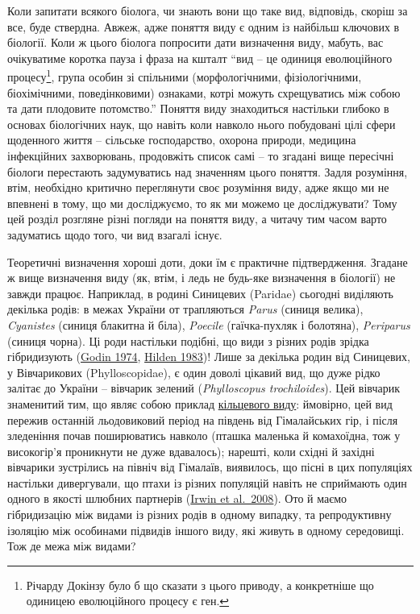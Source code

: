 \documentclass[
  11pt,
]{book}
\begin{document}
Коли запитати всякого біолога, чи знають вони що таке вид, відповідь, скоріш за все, буде ствердна. Авжеж, адже поняття виду є одним із найбільш ключових в біології. Коли ж цього біолога попросити дати визначення виду, мабуть, вас очікуватиме коротка пауза і фраза на кшталт ``вид -- це одиниця еволюційного процесу\footnote{Річарду Докінзу було б що сказати з цього приводу, а конкретніше що одиницею еволюційного процесу є ген.}, група особин зі спільними (морфологічними, фізіологічними, біохімічними, поведінковими) ознаками, котрі можуть схрещуватись між собою та дати плодовите потомство.'' Поняття виду знаходиться настільки глибоко в основах біологічних наук, що навіть коли навколо нього побудовані цілі сфери щоденного життя -- сільське господарство, охорона природи, медицина інфекційних захворювань, продовжіть список самі -- то згадані вище пересічні біологи перестають задумуватись над значенням цього поняття. Задля розуміння, втім, необхідно критично переглянути своє розуміння виду, адже якщо ми не впевнені в тому, що ми досліджуємо, то як ми можемо це досліджувати? Тому цей розділ розгляне різні погляди на поняття виду, а читачу тим часом варто задуматись щодо того, чи вид взагалі існує.

Теоретичні визначення хороші доти, доки їм є практичне підтвердження. Згадане ж вище визначення виду (як, втім, і ледь не будь-яке визначення в біології) не завжди працює. Наприклад, в родині Синицевих (Paridae) сьогодні виділяють декілька родів: в межах України от трапляються \emph{Parus} (синиця велика), \emph{Cyanistes} (синиця блакитна й біла), \emph{Poecile} (гаїчка-пухляк і болотяна), \emph{Periparus} (синиця чорна). Ці роди настільки подібні, що види з різних родів зрідка гібридизують (\href{https://aves.natagora.be/fileadmin/Aves/Bulletins/Articles/11_2/11_2_128.pdf}{Godin 1974}, \href{https://scholar.google.pl/scholar?cluster=17262407877208871166}{Hilden 1983})! Лише за декілька родин від Синицевих, у Вівчарикових (Phylloscopidae), є один доволі цікавий вид, що дуже рідко залітає до України -- вівчарик зелений (\emph{Phylloscopus trochiloides}). Цей вівчарик знаменитий тим, що являє собою приклад \href{https://uk.wikipedia.org/wiki/\%D0\%9A\%D1\%96\%D0\%BB\%D1\%8C\%D1\%86\%D0\%B5\%D0\%B2\%D0\%B8\%D0\%B9_\%D0\%B2\%D0\%B8\%D0\%B4}{кільцевого виду}: ймовірно, цей вид пережив останній льодовиковий період на південь від Гімалайських гір, і після зледеніння почав поширюватись навколо (пташка маленька й комахоїдна, тож у високогір'я проникнути не дуже вдавалось); нарешті, коли східні й західні вівчарики зустрілись на північ від Гімалаїв, виявилось, що пісні в цих популяціях настільки дивергували, що птахи із різних популяцій навіть не сприймають один одного в якості шлюбних партнерів (\href{https://doi.org/10.1111/j.1420-9101.2007.01499.x}{Irwin et al.~2008}). Ото й маємо гібридизацію між видами із різних родів в одному випадку, та репродуктивну ізоляцію між особинами підвидів іншого виду, які живуть в одному середовищі. Тож де межа між видами?
\end{document}
